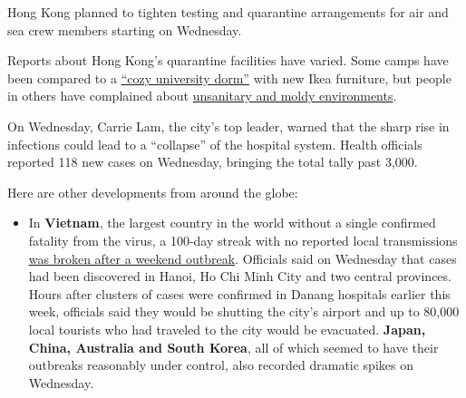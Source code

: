Hong Kong planned to tighten testing and quarantine arrangements for air
and sea crew members starting on Wednesday.

Reports about Hong Kong's quarantine facilities have varied. Some camps
have been compared to a
\href{https://edition.cnn.com/2020/04/09/homepage2/hong-kong-coronavirus-quarantine-diary-intl-hnk/index.html}{``cozy
university dorm''} with new Ikea furniture, but people in others have
complained about
\href{https://hongkongfp.com/2020/04/18/coronavirus-hong-kong-quarantine-arrivals-complain-of-disorderly-unsanitary-govt-facilities/}{unsanitary
and moldy environments}.

On Wednesday, Carrie Lam, the city's top leader, warned that the sharp
rise in infections could lead to a ``collapse'' of the hospital system.
Health officials reported 118 new cases on Wednesday, bringing the total
tally past 3,000.

Here are other developments from around the globe:

\begin{itemize}
\tightlist
\item
  In \textbf{Vietnam}, the largest country in the world without a single
  confirmed fatality from the virus, a 100-day streak with no reported
  local transmissions
  \href{https://www.nytimes3xbfgragh.onion/2020/07/29/world/asia/coronavirus-vietnam.html}{was
  broken after a weekend outbreak}. Officials said on Wednesday that
  cases had been discovered in Hanoi, Ho Chi Minh City and two central
  provinces. Hours after clusters of cases were confirmed in Danang
  hospitals earlier this week, officials said they would be shutting the
  city's airport and up to 80,000 local tourists who had traveled to the
  city would be evacuated. \textbf{Japan, China, Australia and South
  Korea}, all of which seemed to have their outbreaks reasonably under
  control, also recorded dramatic spikes on Wednesday.
\end{itemize}

